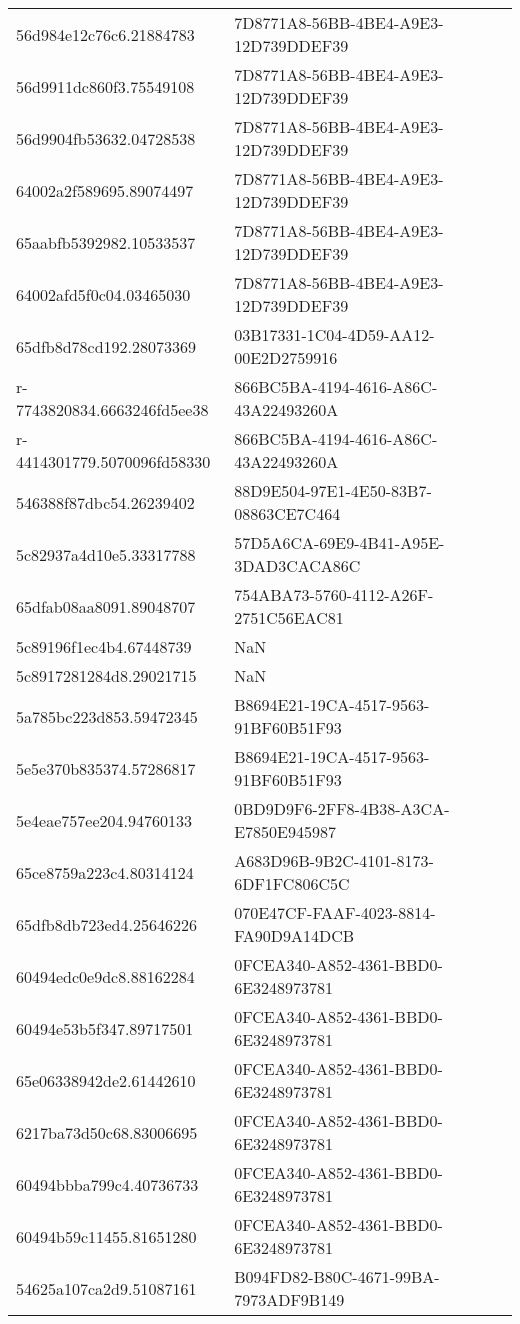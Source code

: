 \begin{tabular}{ll}
56d984e12c76c6.21884783 & 7D8771A8-56BB-4BE4-A9E3-12D739DDEF39 \\
56d9911dc860f3.75549108 & 7D8771A8-56BB-4BE4-A9E3-12D739DDEF39 \\
56d9904fb53632.04728538 & 7D8771A8-56BB-4BE4-A9E3-12D739DDEF39 \\
64002a2f589695.89074497 & 7D8771A8-56BB-4BE4-A9E3-12D739DDEF39 \\
65aabfb5392982.10533537 & 7D8771A8-56BB-4BE4-A9E3-12D739DDEF39 \\
64002afd5f0c04.03465030 & 7D8771A8-56BB-4BE4-A9E3-12D739DDEF39 \\
65dfb8d78cd192.28073369 & 03B17331-1C04-4D59-AA12-00E2D2759916 \\
r-7743820834.6663246fd5ee38 & 866BC5BA-4194-4616-A86C-43A22493260A \\
r-4414301779.5070096fd58330 & 866BC5BA-4194-4616-A86C-43A22493260A \\
546388f87dbc54.26239402 & 88D9E504-97E1-4E50-83B7-08863CE7C464 \\
5c82937a4d10e5.33317788 & 57D5A6CA-69E9-4B41-A95E-3DAD3CACA86C \\
65dfab08aa8091.89048707 & 754ABA73-5760-4112-A26F-2751C56EAC81 \\
5c89196f1ec4b4.67448739 & NaN \\
5c8917281284d8.29021715 & NaN \\
5a785bc223d853.59472345 & B8694E21-19CA-4517-9563-91BF60B51F93 \\
5e5e370b835374.57286817 & B8694E21-19CA-4517-9563-91BF60B51F93 \\
5e4eae757ee204.94760133 & 0BD9D9F6-2FF8-4B38-A3CA-E7850E945987 \\
65ce8759a223c4.80314124 & A683D96B-9B2C-4101-8173-6DF1FC806C5C \\
65dfb8db723ed4.25646226 & 070E47CF-FAAF-4023-8814-FA90D9A14DCB \\
60494edc0e9dc8.88162284 & 0FCEA340-A852-4361-BBD0-6E3248973781 \\
60494e53b5f347.89717501 & 0FCEA340-A852-4361-BBD0-6E3248973781 \\
65e06338942de2.61442610 & 0FCEA340-A852-4361-BBD0-6E3248973781 \\
6217ba73d50c68.83006695 & 0FCEA340-A852-4361-BBD0-6E3248973781 \\
60494bbba799c4.40736733 & 0FCEA340-A852-4361-BBD0-6E3248973781 \\
60494b59c11455.81651280 & 0FCEA340-A852-4361-BBD0-6E3248973781 \\
54625a107ca2d9.51087161 & B094FD82-B80C-4671-99BA-7973ADF9B149 \\

\end{tabular}
